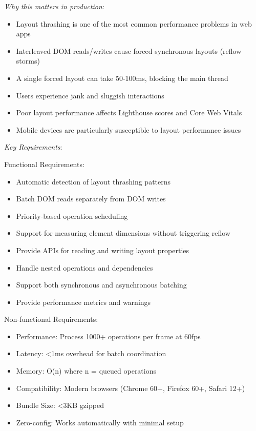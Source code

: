 \documentclass[11pt]{article}
\begin{document}
\emph{Why this matters in production}:

\begin{itemize}
\item Layout thrashing is one of the most common performance problems in web apps
\item Interleaved DOM reads/writes cause forced synchronous layouts (reflow storms)
\item A single forced layout can take 50-100ms, blocking the main thread
\item Users experience jank and sluggish interactions
\item Poor layout performance affects Lighthouse scores and Core Web Vitals
\item Mobile devices are particularly susceptible to layout performance issues
\end{itemize}

\emph{Key Requirements}:

Functional Requirements:

\begin{itemize}
\item Automatic detection of layout thrashing patterns
\item Batch DOM reads separately from DOM writes
\item Priority-based operation scheduling
\item Support for measuring element dimensions without triggering reflow
\item Provide APIs for reading and writing layout properties
\item Handle nested operations and dependencies
\item Support both synchronous and asynchronous batching
\item Provide performance metrics and warnings
\end{itemize}

Non-functional Requirements:

\begin{itemize}
\item Performance: Process 1000+ operations per frame at 60fps
\item Latency: <1ms overhead for batch coordination
\item Memory: O(n) where n = queued operations
\item Compatibility: Modern browsers (Chrome 60+, Firefox 60+, Safari 12+)
\item Bundle Size: <3KB gzipped
\item Zero-config: Works automatically with minimal setup
\end{itemize}
\end{document}
